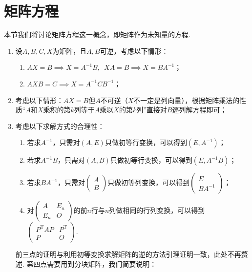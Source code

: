 \section{矩阵方程}

本节我们将讨论矩阵方程这一概念，即矩阵作为未知量的方程.
\begin{enumerate}
    \item 设$A,B,C,X$为矩阵，且$A,B$可逆，考虑以下情形：
          \begin{enumerate}
              \item $AX=B \implies X=A^{-1}B, \enspace XA=B \implies X=BA^{-1}$；

              \item $AXB=C \implies X=A^{-1}CB^{-1}$；
          \end{enumerate}

    \item 考虑以下情形：$AX=B$但$A$不可逆（$X$不一定是列向量），根据矩阵乘法的性质``$A$和$X$乘积的第$k$列等于$A$乘以$X$的第$k$列''直接对$B$逐列解方程即可；

    \item 考虑以下求解方式的合理性：
          \begin{enumerate}
              \item 若求$A^{-1}$，只需对$(A,E)$只做初等行变换，可以得到$(E,A^{-1})$；

              \item 若求$A^{-1}B$，只需对$(A,B)$只做初等行变换，可以得到$(E,A^{-1}B)$；

              \item 若求$BA^{-1}$，只需对$\begin{pmatrix}
                            A \\ B
                        \end{pmatrix}$只做初等列变换，可以得到$\begin{pmatrix}
                            E \\ BA^{-1}
                        \end{pmatrix}$；

              \item 对$\begin{pmatrix}
                            A & E_n \\ E_n & O
                        \end{pmatrix}$的前$n$行与$n$列做相同的行列变换，可以得到$\begin{pmatrix}
                            P^\mathrm{T}AP & P^\mathrm{T} \\ P & O
                        \end{pmatrix}$.
          \end{enumerate}
          前三点的证明与利用初等变换求解矩阵的逆的方法引理证明一致，此处不再赘述. 第四点需要用到分块矩阵，我们简要说明：


\end{enumerate}
